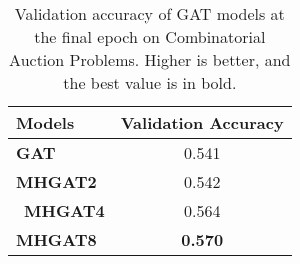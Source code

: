 \begin{table}[htb!]
    \centering
    \begin{tabular}{|l c|}
        \hline
        \textbf{Models} & \textbf{Validation Accuracy}\\
        \hline
        \textbf{GAT} & 0.541\\
        \textbf{MHGAT2} & 0.542\\\
        \textbf{MHGAT4} & 0.564\\
        \textbf{MHGAT8} & \textbf{0.570}\\
        \hline
    \end{tabular}
    \caption{Validation accuracy of GAT models at the final epoch on Combinatorial Auction Problems.
    Higher is better, and the best value is in bold.}
    \label{tab:ca-validation-accuracy}
\end{table}